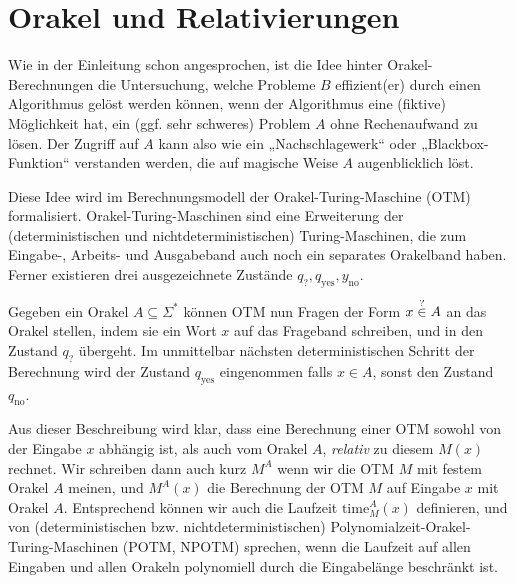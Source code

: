 \section{Orakel und Relativierungen}\label{sec:prelim-orakel}

Wie in der Einleitung schon angesprochen, ist die Idee hinter Orakel-Berechnungen die Untersuchung, welche Probleme $B$ effizient(er) durch einen Algorithmus gelöst werden können, wenn der Algorithmus eine (fiktive) Möglichkeit hat, ein (ggf. sehr schweres) Problem $A$ ohne Rechenaufwand zu lösen.
Der Zugriff auf $A$ kann also wie ein „Nachschlagewerk“ oder „Blackbox-Funktion“ verstanden werden, die auf magische Weise $A$ augenblicklich löst.

Diese Idee wird im Berechnungsmodell der Orakel-Turing-Maschine (OTM) formalisiert. Orakel-Turing-Maschinen sind eine Erweiterung der (deterministischen und nichtdeterministischen) Turing-Maschinen, die zum Eingabe-, Arbeits- und Ausgabeband auch noch ein separates Orakelband haben. Ferner existieren drei ausgezeichnete Zustände $q_?, q_\text{yes}, y_\text{no}$.

Gegeben ein Orakel $A\subseteq\Sigma^*$ können OTM nun Fragen der Form $x\stackrel{\smash ?}{\in} A$ an das Orakel stellen, indem sie ein Wort $x$ auf das Frageband schreiben, und in den Zustand $q_?$ übergeht. Im unmittelbar nächsten deterministischen Schritt der Berechnung wird der Zustand $q_\text{yes}$ eingenommen falls $x\in A$, sonst den Zustand $q_\text{no}$.

Aus dieser Beschreibung wird klar, dass eine Berechnung einer OTM sowohl von der Eingabe $x$ abhängig ist, als auch vom Orakel $A$, \emph{relativ} zu diesem $M(x)$ rechnet. Wir schreiben dann auch kurz $M^A$ wenn wir die OTM $M$ mit festem Orakel $A$ meinen, und $M^A(x)$ die Berechnung der OTM $M$ auf Eingabe $x$ mit Orakel $A$. Entsprechend können wir auch die Laufzeit $\mathrm{time}_M^A(x)$ definieren, und von (deterministischen bzw. nichtdeterministischen) Polynomialzeit-Orakel-Turing-Maschinen (POTM, NPOTM) sprechen, wenn die Laufzeit auf allen Eingaben und allen Orakeln polynomiell durch die Eingabelänge beschränkt ist.


